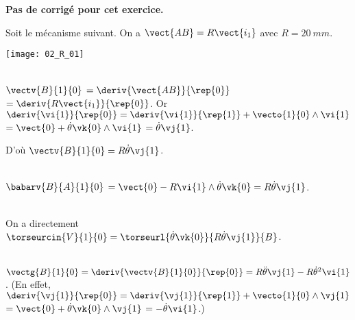 \normaltrue
\correctiontrue


\setcounter{numques}{0}


\ifcorrection
\else
\textbf{Pas de corrigé pour cet exercice.}
\fi

\ifprof
\else
Soit le mécanisme suivant. On a $\vect{AB}=R\vect{i_1}$ avec $R=\SI{20}{mm}$. 
\begin{center}
\texttt{[image: 02\_R\_01]}
\end{center}
\fi

\ifprof ~\\
$\vectv{B}{1}{0}$ $ = \deriv{\vect{AB}}{\rep{0}}$ $=\deriv{R\vect{i_1}}{\rep{0}}$.
Or $\deriv{\vi{1}}{\rep{0}} = \deriv{\vi{1}}{\rep{1}} + \vecto{1}{0}\wedge \vi{1} $ $=\vect{0}+\dot{\theta}\vk{0}\wedge \vi{1}$ $=\dot{\theta}\vj{1}$.

D'où $\vectv{B}{1}{0}=R\dot{\theta}\vj{1}$.
\else
\fi

\ifprof ~\\
$\babarv{B}{A}{1}{0}$ $=\vect{0}-R\vi{1}\wedge \dot{\theta}\vk{0} =R\dot{\theta}\vj{1} $.

\else
\fi

\ifprof ~\\
On a directement $\torseurcin{V}{1}{0} = \torseurl{\dot{\theta}\vk{0}}{R\dot{\theta}\vj{1}}{B}$.
\else
\fi

\ifprof ~\\
 $\vectg{B}{1}{0} = \deriv{\vectv{B}{1}{0}}{\rep{0}}=R\ddot{\theta}\vj{1}-R\dot{\theta}^2\vi{1}$.
(En effet,  $\deriv{\vj{1}}{\rep{0}} = \deriv{\vj{1}}{\rep{1}} + \vecto{1}{0}\wedge \vj{1} $ $=\vect{0}+\dot{\theta}\vk{0}\wedge \vj{1}$ $=-\dot{\theta}\vi{1}$.)
 
\else
\fi


